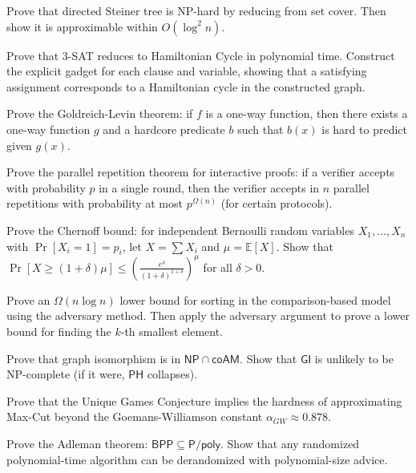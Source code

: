 \documentclass[12pt,a4paper]{exam}
\begin{document}
\begin{questions}
\vspace{0.3cm}

\question[5]
Prove that directed Steiner tree is NP-hard by reducing from set cover. Then show it is approximable within $O(\log^2 n)$.

\vspace{0.3cm}

\question[5]
Prove that 3-SAT reduces to Hamiltonian Cycle in polynomial time. Construct the explicit gadget for each clause and variable, showing that a satisfying assignment corresponds to a Hamiltonian cycle in the constructed graph.

\vspace{0.3cm}

\question[5]
Prove the Goldreich-Levin theorem: if $f$ is a one-way function, then there exists a one-way function $g$ and a hardcore predicate $b$ such that $b(x)$ is hard to predict given $g(x)$.

\vspace{0.3cm}

\question[5]
Prove the parallel repetition theorem for interactive proofs: if a verifier accepts with probability $p$ in a single round, then the verifier accepts in $n$ parallel repetitions with probability at most $p^{\Omega(n)}$ (for certain protocols).

\vspace{0.3cm}

\question[2]
Prove the Chernoff bound: for independent Bernoulli random variables $X_1,\ldots,X_n$ with $\Pr[X_i = 1] = p_i$, let $X = \sum X_i$ and $\mu = \mathbb{E}[X]$. Show that $\Pr[X \geq (1+\delta)\mu] \leq (\frac{e^\delta}{(1+\delta)^{1+\delta}})^\mu$ for all $\delta > 0$.

\vspace{0.3cm}

\question[5]
Prove an $\Omega(n \log n)$ lower bound for sorting in the comparison-based model using the adversary method. Then apply the adversary argument to prove a lower bound for finding the $k$-th smallest element.

\vspace{0.3cm}

\question[3]
Prove that graph isomorphism is in $\mathsf{NP} \cap \mathsf{coAM}$. Show that $\mathsf{GI}$ is unlikely to be NP-complete (if it were, $\mathsf{PH}$ collapses).

\vspace{0.3cm}

\question[4]
Prove that the Unique Games Conjecture implies the hardness of approximating Max-Cut beyond the Goemans-Williamson constant $\alpha_{GW} \approx 0.878$.

\vspace{0.3cm}

\question[5]
Prove the Adleman theorem: $\mathsf{BPP} \subseteq \mathsf{P}/\mathsf{poly}$. Show that any randomized polynomial-time algorithm can be derandomized with polynomial-size advice.

\vspace{0.3cm}

\end{questions}
\end{document}
